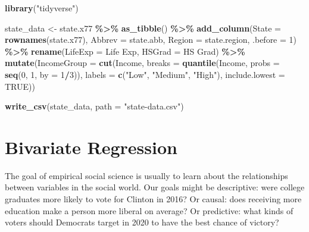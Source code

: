 \documentclass[
  12pt,
  oneside,openany]{book}
\newenvironment{Shaded}{\begin{snugshade}}{\end{snugshade}}
\newcommand{\DataTypeTok}[1]{\textcolor[rgb]{0.13,0.29,0.53}{#1}}
\newcommand{\DecValTok}[1]{\textcolor[rgb]{0.00,0.00,0.81}{#1}}
\newcommand{\KeywordTok}[1]{\textcolor[rgb]{0.13,0.29,0.53}{\textbf{#1}}}
\newcommand{\NormalTok}[1]{#1}
\newcommand{\OperatorTok}[1]{\textcolor[rgb]{0.81,0.36,0.00}{\textbf{#1}}}
\newcommand{\OtherTok}[1]{\textcolor[rgb]{0.56,0.35,0.01}{#1}}
\newcommand{\StringTok}[1]{\textcolor[rgb]{0.31,0.60,0.02}{#1}}
\begin{document}
\begin{Shaded}
\begin{Highlighting}[]
\KeywordTok{library}\NormalTok{(}\StringTok{"tidyverse"}\NormalTok{)}

\NormalTok{state\_data <{-}}\StringTok{ }\NormalTok{state.x77 }\OperatorTok{\%>\%}
\StringTok{  }\KeywordTok{as\_tibble}\NormalTok{() }\OperatorTok{\%>\%}
\StringTok{  }\KeywordTok{add\_column}\NormalTok{(}\DataTypeTok{State =} \KeywordTok{rownames}\NormalTok{(state.x77),}
             \DataTypeTok{Abbrev =}\NormalTok{ state.abb,}
             \DataTypeTok{Region =}\NormalTok{ state.region,}
             \DataTypeTok{.before =} \DecValTok{1}\NormalTok{) }\OperatorTok{\%>\%}
\StringTok{  }\KeywordTok{rename}\NormalTok{(}\DataTypeTok{LifeExp =} \StringTok{\textasciigrave{}}\DataTypeTok{Life Exp}\StringTok{\textasciigrave{}}\NormalTok{,}
         \DataTypeTok{HSGrad =} \StringTok{\textasciigrave{}}\DataTypeTok{HS Grad}\StringTok{\textasciigrave{}}\NormalTok{) }\OperatorTok{\%>\%}
\StringTok{  }\KeywordTok{mutate}\NormalTok{(}\DataTypeTok{IncomeGroup =} \KeywordTok{cut}\NormalTok{(Income,}
                           \DataTypeTok{breaks =} \KeywordTok{quantile}\NormalTok{(Income,}
                                             \DataTypeTok{probs =} \KeywordTok{seq}\NormalTok{(}\DecValTok{0}\NormalTok{, }\DecValTok{1}\NormalTok{, }\DataTypeTok{by =} \DecValTok{1}\OperatorTok{/}\DecValTok{3}\NormalTok{)),}
                           \DataTypeTok{labels =} \KeywordTok{c}\NormalTok{(}\StringTok{"Low"}\NormalTok{, }\StringTok{"Medium"}\NormalTok{, }\StringTok{"High"}\NormalTok{),}
                           \DataTypeTok{include.lowest =} \OtherTok{TRUE}\NormalTok{))}

\KeywordTok{write\_csv}\NormalTok{(state\_data, }\DataTypeTok{path =} \StringTok{"state{-}data.csv"}\NormalTok{)}
\end{Highlighting}
\end{Shaded}

\hypertarget{bivariate}{%
\chapter{Bivariate Regression}\label{bivariate}}

\providecommand{\SSE}{\mathop{\rm SSE}\nolimits}
\providecommand{\RSS}{\mathop{\rm RSS}\nolimits}
\providecommand{\TSS}{\mathop{\rm TSS}\nolimits}
\providecommand{\Cov}{\mathop{\rm Cov}\nolimits}
\providecommand{\pderiv}[2]{\frac{\partial{}#1}{\partial{}#2}}

The goal of empirical social science is usually to learn about the relationships between variables in the social world. Our goals might be descriptive: were college graduates more likely to vote for Clinton in 2016? Or causal: does receiving more education make a person more liberal on average? Or predictive: what kinds of voters should Democrats target in 2020 to have the best chance of victory?
\end{document}
